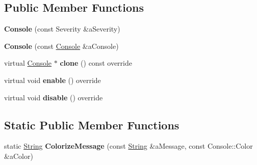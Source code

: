 \subsection*{Public Member Functions}
\begin{DoxyCompactItemize}
\item 
\mbox{\label{classlibrary_1_1core_1_1logger_1_1sinks_1_1_console_a6baabd0bce6777b665aba8b30c40c0d8}} 
{\bfseries Console} (const Severity \&a\+Severity)
\item 
\mbox{\label{classlibrary_1_1core_1_1logger_1_1sinks_1_1_console_a6d7feabeb113b6448d0b83d114175328}} 
{\bfseries Console} (const \hyperlink{classlibrary_1_1core_1_1logger_1_1sinks_1_1_console}{Console} \&a\+Console)
\item 
\mbox{\label{classlibrary_1_1core_1_1logger_1_1sinks_1_1_console_ac5c80193b0832f760a7447e7abc7d468}} 
virtual \hyperlink{classlibrary_1_1core_1_1logger_1_1sinks_1_1_console}{Console} $\ast$ {\bfseries clone} () const override
\item 
\mbox{\label{classlibrary_1_1core_1_1logger_1_1sinks_1_1_console_a09190fa0b66fa9a03792e6a546590da9}} 
virtual void {\bfseries enable} () override
\item 
\mbox{\label{classlibrary_1_1core_1_1logger_1_1sinks_1_1_console_adc1a648433f26cc4397f1e703c9506c7}} 
virtual void {\bfseries disable} () override
\end{DoxyCompactItemize}
\subsection*{Static Public Member Functions}
\begin{DoxyCompactItemize}
\item 
\mbox{\label{classlibrary_1_1core_1_1logger_1_1sinks_1_1_console_a9cf21ce963c2079b613bfb5788bb5659}} 
static \hyperlink{classlibrary_1_1core_1_1types_1_1_string}{String} {\bfseries Colorize\+Message} (const \hyperlink{classlibrary_1_1core_1_1types_1_1_string}{String} \&a\+Message, const Console\+::\+Color \&a\+Color)
\end{DoxyCompactItemize}
